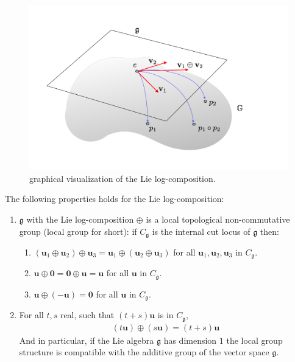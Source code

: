 \begin{figure}[!ht]
	\centering
	\includegraphics[scale=0.35]{figures/log_composition.pdf}
	\caption{graphical visualization of the Lie log-composition.}
	\label{fig:composition}
\end{figure}

\noindent
The following properties holds for the Lie log-composition:
\begin{enumerate}
	\item $\mathfrak{g} $ with the Lie log-composition $\oplus$ is a local topological non-commutative group (local group for short): if $C_{\mathfrak{g}}$ is the internal cut locus of $\mathfrak{g}$ then:
	\begin{enumerate}
		\item $(\mathbf{u}_{1}\oplus\mathbf{u}_{2}) \oplus \mathbf{u}_{3}
		= \mathbf{u}_{1}\oplus(\mathbf{u}_{2} \oplus \mathbf{u}_{3})$ for all $\mathbf{u}_{1}, \mathbf{u}_{2}, \mathbf{u}_{3}$ in $C_{\mathfrak{g}}$.
		\item $\mathbf{u}\oplus\mathbf{0}  = \mathbf{0}\oplus\mathbf{u} = \mathbf{u}$ for all $\mathbf{u}$ in $C_{\mathfrak{g}}$.
		\item $\mathbf{u}\oplus(-\mathbf{u} ) = \mathbf{0}$ for all $\mathbf{u}$ in $C_{\mathfrak{g}}$.
	\end{enumerate}
	\item For all $t,s$ real, such that $(t+s)\mathbf{u}$ is in $C_{\mathfrak{g}}$,
	\begin{align*}
	(t\mathbf{u})\oplus (s\mathbf{u}) = (t+s)\mathbf{u}
	\end{align*}
	And in particular, if the Lie algebra $\mathfrak{g}$ has dimension $1$ the local group structure is compatible with the additive group of the vector space $\mathfrak{g}$.
\end{enumerate}

